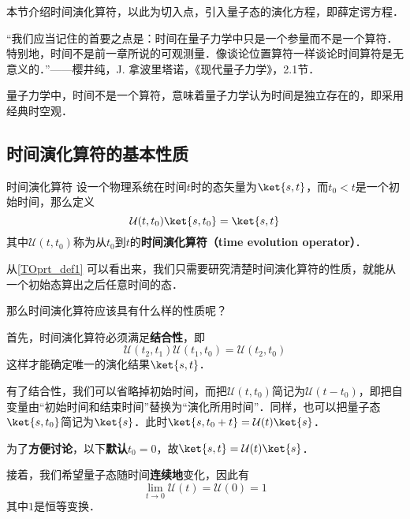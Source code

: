 


本节介绍时间演化算符，以此为切入点，引入量子态的演化方程，即薛定谔方程．


“我们应当记住的首要之点是：时间在量子力学中只是一个参量而不是一个算符．特别地，时间不是前一章所说的可观测量．像谈论位置算符一样谈论时间算符是无意义的．”——樱井纯，J. 拿波里塔诺，《现代量子力学》，2.1节．

量子力学中，时间不是一个算符，意味着量子力学认为时间是独立存在的，即采用经典时空观．


\subsection{时间演化算符的基本性质}

\begin{definition}{时间演化算符}\label{TOprt_def1}
设一个物理系统在时间$t$时的态矢量为$\ket{s, t}$，而$t_0<t$是一个初始时间，那么定义
\begin{equation}\label{TOprt_eq1}
\mathcal{U}(t, t_0)\ket{s, t_0}=\ket{s, t}
\end{equation}
其中$\mathcal{U}(t, t_0)$称为从$t_0$到$t$的\textbf{时间演化算符（time evolution operator）}．
\end{definition}

从\autoref{TOprt_def1} 可以看出来，我们只需要研究清楚时间演化算符的性质，就能从一个初始态算出之后任意时间的态．

那么时间演化算符应该具有什么样的性质呢？


首先，时间演化算符必须满足\textbf{结合性}，即
\begin{equation}\label{TOprt_eq2}
\mathcal{U}(t_2, t_1)\mathcal{U}(t_1, t_0) = \mathcal{U}(t_2, t_0)
\end{equation}
这样才能确定唯一的演化结果$\ket{s, t}$．

有了结合性，我们可以省略掉初始时间，而把$\mathcal{U}(t, t_0)$简记为$\mathcal{U}(t-t_0)$，即把自变量由“初始时间和结束时间”替换为“演化所用时间”．同样，也可以把量子态$\ket{s, t_0}$简记为$\ket{s}$．此时$\ket{s, t_0+t}=\mathcal{U}(t)\ket{s}$．

为了\textbf{方便讨论}，以下\textbf{默认}$t_0=0$，故$\ket{s, t}=\mathcal{U}(t)\ket{s}$．

接着，我们希望量子态随时间\textbf{连续地}变化，因此有
\begin{equation}\label{TOprt_eq3}
\lim_{t\to 0}\mathcal{U}(t) = \mathcal{U}(0) = 1
\end{equation}
其中$1$是恒等变换．


